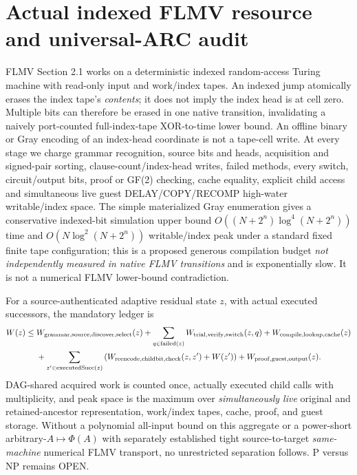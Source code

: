 \documentclass[11pt]{article}
\begin{document}
\section{Actual indexed FLMV resource and universal-ARC audit}
FLMV Section 2.1 works on a deterministic indexed random-access Turing machine with read-only input and work/index tapes. An indexed jump atomically erases the index tape's \emph{contents}; it does not imply the index head is at cell zero. Multiple bits can therefore be erased in one native transition, invalidating a naively port-counted full-index-tape XOR-to-time lower bound. An offline binary or Gray encoding of an index-head coordinate is not a tape-cell write. At every stage we charge grammar recognition, source bits and heads, acquisition and signed-pair sorting, clause-count/index-head writes, failed methods, every switch, circuit/output bits, proof or GF(2) checking, cache equality, explicit child access and simultaneous live guest DELAY/COPY/RECOMP high-water writable/index space. The simple materialized Gray enumeration gives a conservative indexed-bit simulation upper bound $O((N+2^n)\log^4(N+2^n))$ time and $O(N\log^2(N+2^n))$ writable/index peak under a standard fixed finite tape configuration; this is a proposed generous compilation budget \emph{not independently measured in native FLMV transitions} and is exponentially slow. It is not a numerical FLMV lower-bound contradiction.

For a source-authenticated adaptive residual state $z$, with actual executed successors, the mandatory ledger is
\[
\begin{split}
W(z)\le{}& W_{\rm grammar,source,discover,select}(z)+
\sum_{q\in {\rm failed}(z)}W_{\rm trial,verify,switch}(z,q)
+ W_{\rm compile,lookup,cache}(z)\\
&+\sum_{z'\in{\rm executedSucc}(z)}
\left(W_{\rm reencode,childbit,check}(z,z')+W(z')\right)
+W_{\rm proof,guest,output}(z).
\end{split}
\]
DAG-shared acquired work is counted once, actually executed child calls with multiplicity, and peak space is the maximum over \emph{simultaneously live} original and retained-ancestor representation, work/index tapes, cache, proof, and guest storage. Without a polynomial all-input bound on this aggregate or a power-short arbitrary-$A\mapsto\Phi(A)$ with separately established tight source-to-target \emph{same-machine} numerical FLMV transport, no unrestricted separation follows. P versus NP remains OPEN.
\end{document}
